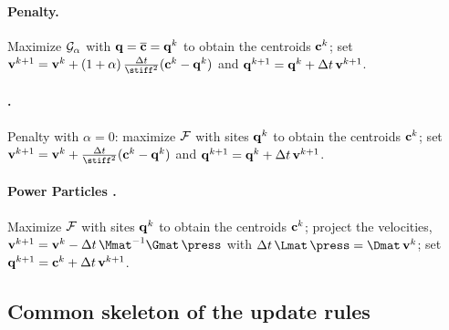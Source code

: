 \documentclass[main.tex]{subfiles}
\begin{document}
\paragraph{Penalty.}
Maximize $\mathcal{G}_\alpha$ with $\mathbf{q} = \overline{\mathbf{c}} = \mathbf{q}^k$ to obtain the centroids $\mathbf{c}^k$; set $\vel^{k+1} = \vel^k + (1 + \alpha)\,\tfrac{\tstep}{\stiff^2}(\centroid^k - \qq^k)$ and $\mathbf{q}^{k+1} = \mathbf{q}^k + \Delta t\,\mathbf{v}^{k+1}$.

\paragraph{\citet{Gallouet2018Lagrangian}.}
Penalty with $\alpha = 0$: maximize $\mathcal{F}$ with sites $\mathbf{q}^k$ to obtain the centroids $\mathbf{c}^k$; set $\vel^{k+1} = \vel^k + \tfrac{\tstep}{\stiff^2}(\centroid^k - \qq^k)$ and $\mathbf{q}^{k+1} = \mathbf{q}^k + \Delta t\,\mathbf{v}^{k+1}$.

\paragraph{Power Particles \cite{deGoes2015PowerParticles}.}
Maximize $\mathcal{F}$ with sites $\mathbf{q}^k$ to obtain the centroids $\mathbf{c}^k$; project the velocities, $\vel^{k+1} = \vel^k - \tstep\,\Mmat^{-1}\Gmat\,\press$ with $\tstep\,\Lmat\,\press = \Dmat\,\vel^k$; set $\mathbf{q}^{k+1} = \mathbf{c}^k + \Delta t\,\mathbf{v}^{k+1}$.

\subsection*{Common skeleton of the update rules}
\end{document}
